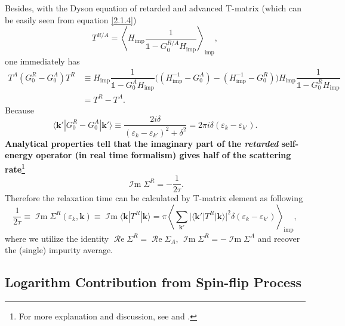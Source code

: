 \documentclass[aps,prx,superscriptaddress,onecolumn,preprintnumbers,nofootinbib,longbibliography]{revtex4-1}
\def\Re{\mathop{\mathcal{R}e}}
\def\Im{\mathop{\mathcal{I}m}}
\def\imp{\text{imp}}
\begin{document}
		\indent Besides, with the Dyson equation of retarded and advanced T-matrix (which can be easily seen from equation \eqref{2.1.4})
		\begin{equation*}
			T^{R/A}=\left\langle H_{\imp}\dfrac{1}{\mathds{1}-G_0^{R/A}H_{\imp}}\right\rangle_\imp,
		\end{equation*}
		one immediately has
		\begin{align*}
			T^A(G_0^R-G_0^A)T^R&\equiv H_\imp \dfrac{1}{\mathds{1}-G_0^A H_\imp}\bigg((H_\imp^{-1}-G_0^A)-(H_\imp^{-1}-G_0^R)\bigg)H_\imp \dfrac{1}{\mathds{1}-G_0^R H_\imp}\\
			&=T^R-T^A.
		\end{align*}
		Because
		\begin{equation*}
			\langle\bm{k'}|G_0^R-G_0^A|\bm{k'}\rangle\equiv\dfrac{2i\delta}{(\varepsilon_k- \varepsilon_{k'})^2+\delta^2}=2\pi i\delta(\varepsilon_k- \varepsilon_{k'}).
		\end{equation*}
		\indent \textbf{Analytical properties tell that the imaginary part of the \emph{retarded} self-energy operator (in real time formalism) gives half of the scattering rate}\footnote{For more explanation and discussion, see \cite{altland2010condensed} and \cite{abrikosov2012methods}.}
		\begin{equation*}
		 	\Im\Sigma^R=-\frac{1}{2\tau}.
		 \end{equation*}
		Therefore the relaxation time can be calculated by T-matrix element as following
		\begin{equation}\label{2.1.7}
			\boxed{\dfrac{1}{2\tau}\equiv\Im \Sigma^R(\varepsilon_k,\bm{k})\equiv\Im\langle\bm{k}|T^R|\bm{k}\rangle=\pi\left\langle\sum_{\bm{k'}}|\langle\bm{k'}|T^R|\bm{k}\rangle|^2\delta(\varepsilon_k- \varepsilon_{k'})\right\rangle_{\imp}},
		\end{equation}
		where we utilize the identity $\Re\Sigma^R=\Re \Sigma_A$, $\Im\Sigma^R=-\Im\Sigma^A$ and recover the (single) impurity average.
	
	\subsection{Logarithm Contribution from Spin-flip Process}

\iffalse
	One tempts to utilize \emph{Drude fomula} to connect relaxation time \eqref{2.1.7} we derived before with the conductivity. However, this rude substitution is not correct because forward scattering and backward scattering cannot be symmetric, otherwise electron cannot be transport and the conductance should always be zero.\par
\fi
\end{document}
